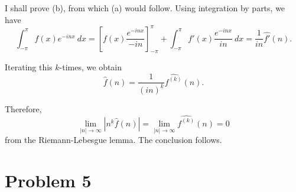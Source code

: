\documentclass[12pt]{amsart}
\newcommand{\wh}[1]{\widehat{#1}}
\begin{document}
I shall prove (b), from which (a) would follow. Using integration by parts, we have 
\begin{equation*}
    \int_{-\pi}^\pi f(x)e^{-inx}~dx = \left[f(x)\frac{e^{-inx}}{-in}\right]_{-\pi}^\pi + \int_{-\pi}^\pi f'(x)\frac{e^{-inx}}{in}~dx = \frac{1}{in}\wh{f'}(n).
\end{equation*}

Iterating this $k$-times, we obtain 
\begin{equation*}
    \wh f(n) = \frac{1}{(in)^k}\wh{f^{(k)}}(n).
\end{equation*}

Therefore, 
\begin{equation*}
    \lim_{|n|\to\infty}|n^k\wh f(n)| = \lim_{|n|\to\infty} \wh{f^{(k)}}(n) = 0
\end{equation*}
from the Riemann-Lebesgue lemma. The conclusion follows.

\section*{Problem 5}
\end{document}
